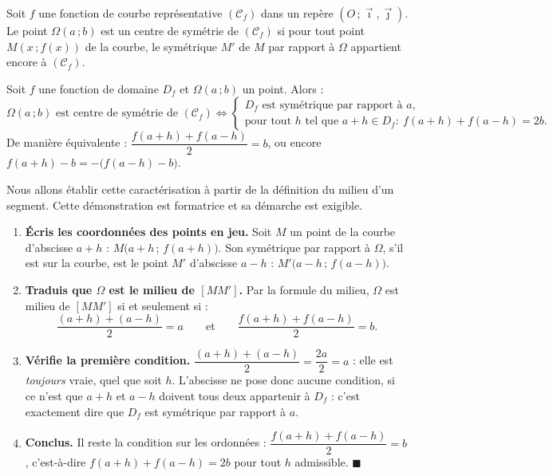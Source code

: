 \documentclass[11pt]{article}
\newcommand{\cle}[1]{{\popxbold\color{popdark}#1}}
\begin{document}
\begin{definition}
Soit $f$ une fonction de courbe représentative $(\mathcal{C}_f)$ dans un repère $(O\,;\vec{\imath},\vec{\jmath})$. Le point $\Omega(a\,;b)$ est un \cle{centre de symétrie} de $(\mathcal{C}_f)$ si pour tout point $M(x\,;f(x))$ de la courbe, le symétrique $M'$ de $M$ par rapport à $\Omega$ appartient encore à $(\mathcal{C}_f)$.
\end{definition}

\begin{propriete}
Soit $f$ une fonction de domaine $D_f$ et $\Omega(a\,;b)$ un point. Alors :
\[ \Omega(a\,;b) \text{ est centre de symétrie de } (\mathcal{C}_f) \iff \begin{cases} D_f \text{ est symétrique par rapport à } a,\\ \text{pour tout } h \text{ tel que } a+h \in D_f : \ f(a+h) + f(a-h) = 2b. \end{cases} \]
De manière équivalente : $\dfrac{f(a+h)+f(a-h)}{2} = b$, ou encore $f(a+h) - b = -\bigl(f(a-h) - b\bigr)$.
\end{propriete}

\begin{experience}
Nous allons établir cette caractérisation à partir de la définition du milieu d'un segment. Cette démonstration est formatrice et sa démarche est exigible.
\begin{enumerate}
\item \textbf{Écris les coordonnées des points en jeu.} Soit $M$ un point de la courbe d'abscisse $a+h$ : $M\bigl(a+h\,;\, f(a+h)\bigr)$. Son symétrique par rapport à $\Omega$, s'il est sur la courbe, est le point $M'$ d'abscisse $a-h$ : $M'\bigl(a-h\,;\, f(a-h)\bigr)$.
\item \textbf{Traduis que $\Omega$ est le milieu de $[MM']$.} Par la formule du milieu, $\Omega$ est milieu de $[MM']$ si et seulement si :
\[ \frac{(a+h)+(a-h)}{2} = a \qquad \text{et} \qquad \frac{f(a+h)+f(a-h)}{2} = b. \]
\item \textbf{Vérifie la première condition.} $\dfrac{(a+h)+(a-h)}{2} = \dfrac{2a}{2} = a$ : elle est \emph{toujours} vraie, quel que soit $h$. L'abscisse ne pose donc aucune condition, si ce n'est que $a+h$ et $a-h$ doivent tous deux appartenir à $D_f$ : c'est exactement dire que $D_f$ est symétrique par rapport à $a$.
\item \textbf{Conclus.} Il reste la condition sur les ordonnées : $\dfrac{f(a+h)+f(a-h)}{2} = b$, c'est-à-dire $f(a+h) + f(a-h) = 2b$ pour tout $h$ admissible. $\blacksquare$
\end{enumerate}
\end{experience}
\end{document}
